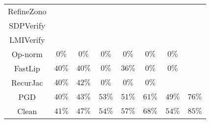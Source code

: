 \begin{table}
{\begin{tabular}{c|c|c|c|c|c|c|c}
   RefineZono &               &               &               &               &               &               &               \\
    SDPVerify &               &               &               &               &               &               &               \\
    LMIVerify &               &               &               &               &               &               &               \\
      Op-norm &         $0\%$ &         $0\%$ &         $0\%$ &         $0\%$ &         $0\%$ &         $0\%$ &               \\
      FastLip &        $40\%$ &        $40\%$ &         $0\%$ &        $36\%$ &         $0\%$ &         $0\%$ &               \\
     RecurJac &        $40\%$ &        $42\%$ &         $0\%$ &         $0\%$ &         $0\%$ &               &               \\
\hline
          PGD &        $40\%$ &        $43\%$ &        $53\%$ &        $51\%$ &        $61\%$ &        $49\%$ &        $76\%$ \\
\hline
        Clean &        $41\%$ &        $47\%$ &        $54\%$ &        $57\%$ &        $68\%$ &        $54\%$ &        $85\%$ \\

    \bottomrule
    \end{tabular}
    }
    \label{table:exp-A-robust-accuracy-cifar10-0}
\end{table}
    

